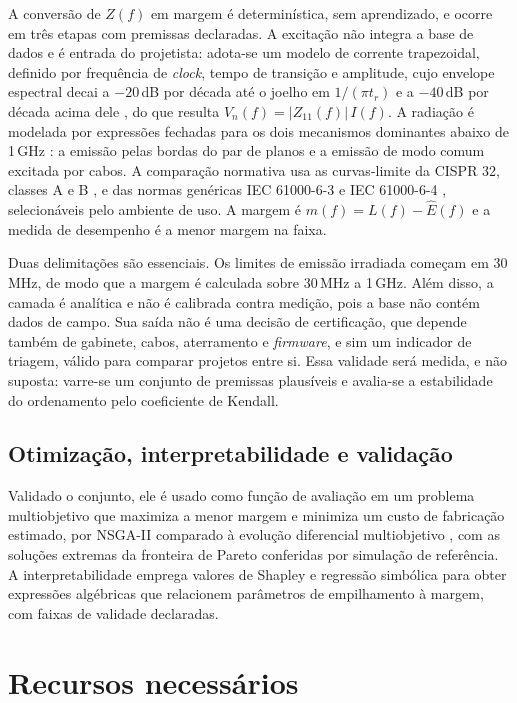 A conversão de $Z(f)$ em margem é determinística, sem aprendizado, e ocorre em três
etapas com premissas declaradas. A excitação não integra a base de dados e é entrada
do projetista: adota-se um modelo de corrente trapezoidal, definido por frequência
de \textit{clock}, tempo de transição e amplitude, cujo envelope espectral decai a
$-20$\,dB por década até o joelho em $1/(\pi t_r)$ e a $-40$\,dB por década acima
dele \citep{johnson1993}, do que resulta $V_n(f) = |Z_{11}(f)|\,I(f)$. A radiação é
modelada por expressões fechadas para os dois mecanismos dominantes abaixo de
1\,GHz \citep{ott2009}: a emissão pelas bordas do par de planos e a emissão de modo
comum excitada por cabos. A comparação normativa usa as curvas-limite da CISPR 32,
classes A e B \citep{cispr32}, e das normas genéricas IEC 61000-6-3
\citep{iec610006m3} e IEC 61000-6-4 \citep{iec610006m4}, selecionáveis pelo ambiente
de uso. A margem é $m(f) = L(f) - \hat{E}(f)$ e a medida de desempenho é a menor
margem na faixa.

Duas delimitações são essenciais. Os limites de emissão irradiada começam em
30\,MHz, de modo que a margem é calculada sobre 30\,MHz a 1\,GHz. Além disso, a
camada é analítica e não é calibrada contra medição, pois a base não contém dados de
campo. Sua saída não é uma decisão de certificação, que depende também de gabinete,
cabos, aterramento e \textit{firmware}, e sim um indicador de triagem, válido para
comparar projetos entre si. Essa validade será medida, e não suposta: varre-se um
conjunto de premissas plausíveis e avalia-se a estabilidade do ordenamento pelo
coeficiente de Kendall.

\subsection{Otimização, interpretabilidade e validação}
\label{subsec:validacao}

Validado o conjunto, ele é usado como função de avaliação em um problema
multiobjetivo que maximiza a menor margem e minimiza um custo de fabricação
estimado, por NSGA-II \citep{deb2002} comparado à evolução diferencial multiobjetivo
\citep{coelho2010}, com as soluções extremas da fronteira de Pareto conferidas por
simulação de referência. A interpretabilidade emprega valores de Shapley
\citep{lundberg2017} e regressão simbólica \citep{tessaro2026} para obter expressões
algébricas que relacionem parâmetros de empilhamento à margem, com faixas de
validade declaradas.

\section{Recursos necessários}
\label{sec:recursos}

